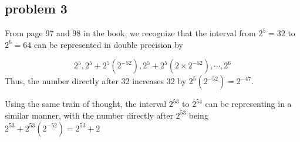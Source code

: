 \documentclass[12pt,a4paper,twoside]{article}
\begin{document}
\subsection{problem 3}
From page 97 and 98 in the book, we recognize that the interval from $2^5=32$ to $2^6=64$ can be represented in double precision by 

\begin{equation}
2^5, 2^5 + 2^5(2^{-52}) , 2^5 + 2^5(2\times 2^{-52}), \cdots , 2^6
\end{equation}
Thus, the number directly after 32 increases 32 by $2^5(2^{-52}) = 2^{-47}$.

Using the same train of thought, the interval $2^{53}$ to $2^{54}$ can be representing in a similar manner, with the number directly after $2^{53}$ being $2^{53}+2^{53}(2^{-52})=2^{53}+2$
\end{document}

